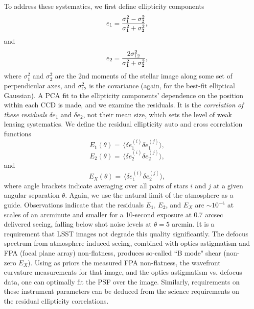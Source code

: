 To address these systematics, we first define ellipticity components
\begin{equation}
 e_1 = {\sigma_1^2 - \sigma_2^2 \over \sigma_1^2 + \sigma_2^2},
\end{equation}
and
\begin{equation}
 e_2 = {2 \sigma_{12}^2 \over \sigma_1^2 + \sigma_2^2},
\end{equation}
where $\sigma_1^2$ and $\sigma_2^2$ are the 2nd moments of the stellar
image along some set of perpendicular axes, and $\sigma_{12}^2$ is the
covariance (again, for the best-fit elliptical Gaussian).
A PCA fit to the ellipticity components’ dependence on the position within
each CCD is made, and we examine the residuals.
It is the \textit{correlation of these residuals} $\delta e_1$
and $\delta e_2$, not their
mean size, which sets the level of weak lensing systematics.  We
define the residual ellipticity auto and cross correlation functions
\begin{equation}
 E_1(\theta) = \, \langle \delta e_1^{(i)}\delta e_1^{(j)} \rangle,
\end{equation}
\begin{equation}
 E_2(\theta) = \, \langle \delta e_2^{(i)}\delta e_2^{(j)} \rangle,
\end{equation}
and
\begin{equation}
 E_X(\theta) = \, \langle \delta e_1^{(i)}\delta e_2^{(j)} \rangle,
\end{equation}
where angle brackets indicate averaging over all pairs of stars $i$ and
$j$ at a given angular separation $\theta$.  Again, we use the natural
limit of the atmosphere as a guide.  Observations indicate that the residuals $E_1$,
$E_2$, and $E_X$ are $\sim 10^{-4}$ at scales of an arcminute and smaller for
a 10-second exposure at 0.7 arcsec delivered seeing, falling below shot noise
levels at $\theta = 5$ arcmin.  It is a requirement that LSST images not degrade
this quality significantly. The defocus spectrum from atmosphere induced seeing,
combined with optics astigmatism and FPA (focal plane array) non-flatness, produces
so-called ``B mode" shear (non-zero $E_X$). Using as priors the measured FPA non-flatness, the wavefront
curvature measurements for that image, and the optics astigmatism vs. defocus
data,
one can optimally fit the PSF over the image. Similarly, requirements on these
instrument parameters can be deduced from the science requirements on the
residual ellipticity correlations.



